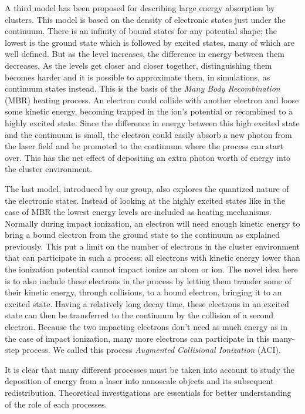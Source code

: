 A third model has been proposed for describing large energy absorption by
clusters. This model is based on the density of electronic states just under
the continuum. There is an infinity of bound states for any potential shape;
the lowest is the ground state which is followed by excited states, many of
which are well defined. But as the level increases, the difference in energy
between them decreases. As the levels get closer and closer together,
distinguishing them becomes harder and it is possible to approximate them, in
simulations, as continuum states instead. This is the basis of the \textit{Many
Body Recombination} (MBR) heating process. An electron could collide with
another electron and loose some kinetic energy, becoming trapped in the ion's
potential or recombined to a highly excited state. Since the difference in
energy between this high excited state and the continuum is small, the electron
could easily absorb a new photon from the laser field and be promoted to the
continuum where the process can start over. This has the net effect of
depositing an extra photon worth of energy into the cluster environment.

The last model, introduced by our group, also explores the quantized nature of
the electronic states. Instead of looking at the highly excited states like
in the case of MBR the lowest energy levels are included as heating mechanisms.
Normally during impact ionization, an electron will need enough kinetic energy
to bring a bound electron from the ground state to the continuum as explained
previously. This put a limit on the number of electrons in the cluster
environment that can participate in such a process; all electrons with
kinetic energy lower than the ionization potential cannot impact ionize an atom
or ion. The novel idea here is to also include these electrons in the process
by letting them transfer some of their kinetic energy, through collisions, to a
bound electron, bringing it to an excited state. Having a relatively long decay
time, these electrons in an excited state can then be transferred to the
continuum by the collision of a second electron. Because the two impacting
electrons don't need as much energy as in the case of impact ionization, many
more electrons can participate in this many-step process. We called this
process \textit{Augmented Collisional Ionization} (ACI).

It is clear that many different processes must be taken into account to study
the deposition of energy from a laser into nanoscale objects and its subsequent
redistribution. Theoretical investigations are essentials for better
understanding of the role of each processes.

